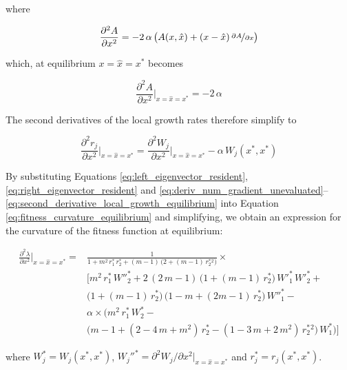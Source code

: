 where

\begin{equation}
    \frac{\partial^2 A}{\partial x^2} = -2\,\alpha\,\big( A(x,\hat{x}) + (x-\hat{x})\,\nicefrac{\partial A}{\partial x} \big)
\end{equation}

which, at equilibrium $x=\hat{x}=x^*$ becomes

\begin{equation}
    \frac{\partial^2 A}{\partial x^2}\bigg|_{x=\hat{x}=x^*} = -2\,\alpha
\end{equation}

The second derivatives of the local growth rates therefore simplify to

\begin{equation}
    \frac{\partial^2 r_j}{\partial x^2}\bigg|_{x=\hat{x}=x^*}= \frac{\partial^2 W_j}{\partial x^2}\bigg|_{x=\hat{x}=x^*} - \alpha \, W_j(x^*,x^*)
    \label{eq:second_derivative_local_growth_equilibrium}
\end{equation}

By substituting Equations \ref{eq:left_eigenvector_resident}, \ref{eq:right_eigenvector_resident} and \ref{eq:deriv_num_gradient_unevaluated}--\ref{eq:second_derivative_local_growth_equilibrium} into Equation \ref{eq:fitness_curvature_equilibrium} and simplifying, we obtain an expression for the curvature of the fitness function at equilibrium:

\begin{equation}
    \begin{split}
        \frac{\partial^2 \lambda}{\partial x^2}\bigg|_{x=\hat x=x^*}=&\frac{1}{1 + m^2\,r^*_1\,r^*_2 + (m - 1)\,\big(2 + (m - 1)\,r^*_2^2\big)} \times \\
        &\Bigg[m^2\, r^*_ 1\, W''^*_2 + 2\, (2\, m - 1)\, \big(1 + (m - 1)\, r^*_ 2\big)\, W'^*_1 \, W'^*_2 +\\
        &\big(1 + (m - 1) \, r^*_ 2\big)\, \big(1 - m + (2 m - 1) \,r^*_ 2\big)\, W''^*_1 -\\
        &\alpha \times \Big(m^2\, r^*_ 1\, W^*_2 - \\
        & \big(m - 1 + (2 - 4\,m + m^2)\, r^*_ 2 - (1 - 3\,m + 2\,m^2)\,r^*_ 2^2\big)\,W^*_1 \Big)\Bigg]
    \end{split}
    \label{eq:fitness_curvature_equilibrium_expression}
\end{equation}

where $W_j^* = W_j(x^*, x^*)$, $W_j''^* = \partial^2 W_j / \partial x^2 |_{x=\hat{x}=x^*}$ and $r_j^* = r_j(x^*, x^*)$.\\


